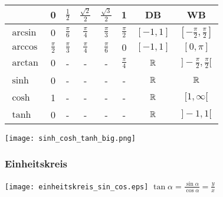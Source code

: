 \begin{minipage}{0.25\textwidth}
	\vspace{0pt}
	{\footnotesize
	\begin{tabular}{|l||c|c|c|c|c||c|c|}\hline
		 & 0 & $\frac{1}{2}$ & $\frac{\sqrt{2}}{2}$ & $\frac{\sqrt{3}}{2}$ & 1 & DB & WB\\ \hline
		$\arcsin$ & 0 & $\frac{\pi}{6}$ & $\frac{\pi}{4}$ & $\frac{\pi}{3}$ & $\frac{\pi}{2}$ & 
		$[-1, 1]$ & $[-\frac{\pi}{2}, \frac{\pi}{2}]$\\ \hline 

		$\arccos$ & $\frac{\pi}{2}$ & $\frac{\pi}{3}$ & $\frac{\pi}{4}$ & $\frac{\pi}{6}$ & $0$ & 
		$[-1, 1]$ & $[0, \pi]$\\ \hline 

		$\arctan$ & $0$ & - & - & - & $\frac{\pi}{4}$ & $\mathbb{R}$ & $]- \frac{\pi}{2}, \frac{\pi}{2}[$\\ \hline 

		$\sinh$ & 0 & - & - & - & - & $\mathbb{R}$ & $\mathbb{R}$\\ \hline
		$\cosh$ & 1 & - & - & - & - & $\mathbb{R}$ & $[1, \infty[$\\ \hline
		$\tanh$ & 0 & - & - & - & - & $\mathbb{R}$ & $]-1, 1[$\\ \hline
	\end{tabular}
	}
\end{minipage}
\begin{minipage}{0.25\textwidth}
		\vspace{0pt}
		\hspace{1.05cm}\texttt{[image: sinh\_cosh\_tanh\_big.png]}
\end{minipage}


\subsubsection{Einheitskreis}
\texttt{[image: einheitskreis\_sin\_cos.eps]}
$\tan \alpha = \frac{\sin \alpha}{\cos \alpha} = \frac{y}{x}$
\pagebreak

